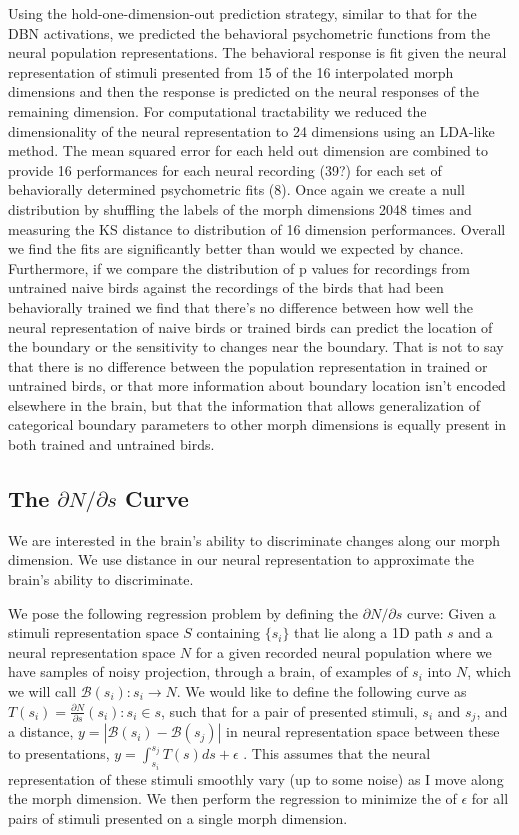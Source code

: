 Using the hold-one-dimension-out prediction strategy, similar to that for the DBN activations, we predicted the behavioral psychometric functions from the neural population representations. The behavioral response is fit given the neural representation of stimuli presented from 15 of the 16 interpolated morph dimensions and then the response is predicted on the neural responses of the remaining dimension. For computational tractability we reduced the dimensionality of the neural representation to 24 dimensions using an LDA-like method. The mean squared error for each held out dimension are combined to provide 16 performances for each neural recording (39?) for each set of behaviorally determined psychometric fits (8). Once again we create a null distribution by shuffling the labels of the morph dimensions 2048 times and measuring the KS distance to distribution of 16 dimension performances. Overall we find the fits are significantly better than would we expected by chance. Furthermore, if we compare the distribution of p values for recordings from untrained naive birds against the recordings of the birds that had been behaviorally trained we find that there's no difference between how well the neural representation of naive birds or trained birds can predict the location of the boundary or the sensitivity to changes near the boundary. That is not to say that there is no difference between the population representation in trained or untrained birds, or that more information about boundary location isn't encoded elsewhere in the brain, but that the information that allows generalization of categorical boundary parameters to other morph dimensions is equally present in both trained and untrained birds.

\subsection{The $\partial N / \partial s$ Curve}



We are interested in the brain's ability to discriminate changes along our morph dimension. We use distance in our neural representation to approximate the brain's ability to discriminate. 

We pose the following regression problem by defining the $\partial N / \partial s$ curve:
Given a stimuli representation space $S$ containing $\{s_i\}$ that lie along a 1D path $s$ and a neural representation space $N$ for a given recorded neural population where we have samples of noisy projection, through a brain, of examples of $s_i$ into $N$, which we will call $\mathcal{B}(s_i):s_i \to N$.
We would like to define the following curve as $T(s_i)=\frac{\partial N}{\partial s} (s_i): s_i \in s$, such that for a pair of presented stimuli, $s_i$ and $s_j$, and a distance, $y=|\mathcal{B}(s_i) - \mathcal{B}(s_j)|$ in neural representation space between these to presentations, $y = \int_{s_i}^{s_j}T(s)ds + \epsilon$ . This assumes that the neural representation of these stimuli smoothly vary (up to some noise) as I move along the morph dimension. We then perform the regression to minimize the \MSE of $\epsilon$ for all pairs of stimuli presented on a single morph dimension.

